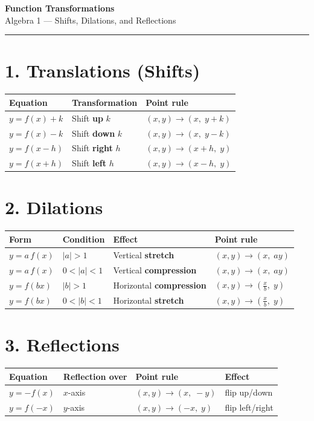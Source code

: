 \documentclass[12pt]{article}
\begin{document}
\begin{center}
  {\LARGE\textbf{Function Transformations}}\\[5pt]
  {\large Algebra 1 --- Shifts, Dilations, and Reflections}
\end{center}
\hrule\vspace{0.7em}

\section*{1. Translations (Shifts)}
\renewcommand{\arraystretch}{1.35}
\begin{center}
\begin{tabular}{lll}
\toprule
\textbf{Equation} & \textbf{Transformation} & \textbf{Point rule} \\
\midrule
$y=f(x)+k$ & Shift \textbf{up} $k$    & $(x,y)\to(x,\;y+k)$ \\
$y=f(x)-k$ & Shift \textbf{down} $k$  & $(x,y)\to(x,\;y-k)$ \\
$y=f(x-h)$ & Shift \textbf{right} $h$ & $(x,y)\to(x+h,\;y)$ \\
$y=f(x+h)$ & Shift \textbf{left} $h$  & $(x,y)\to(x-h,\;y)$ \\
\bottomrule
\end{tabular}
\end{center}

\section*{2. Dilations}
\begin{center}
\begin{tabular}{llll}
\toprule
\textbf{Form} & \textbf{Condition} & \textbf{Effect} & \textbf{Point rule}\\
\midrule
$y=a\,f(x)$ & $|a|>1$     & Vertical \textbf{stretch}       & $(x,y)\to(x,\;ay)$\\
$y=a\,f(x)$ & $0<|a|<1$   & Vertical \textbf{compression}   & $(x,y)\to(x,\;ay)$\\
$y=f(bx)$   & $|b|>1$     & Horizontal \textbf{compression} & $(x,y)\to(\frac{x}{b},\;y)$\\
$y=f(bx)$   & $0<|b|<1$   & Horizontal \textbf{stretch}     & $(x,y)\to(\frac{x}{b},\;y)$\\
\bottomrule
\end{tabular}
\end{center}

\section*{3. Reflections}
\begin{center}
\begin{tabular}{llll}
\toprule
\textbf{Equation} & \textbf{Reflection over} & \textbf{Point rule} & \textbf{Effect}\\
\midrule
$y=-f(x)$ & $x$-axis & $(x,y)\to(x,\;-y)$ & flip up/down\\
$y=f(-x)$ & $y$-axis & $(x,y)\to(-x,\;y)$ & flip left/right\\
\bottomrule
\end{tabular}
\end{center}
\end{document}
